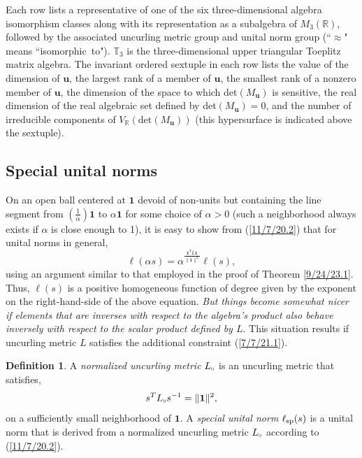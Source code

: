 \documentclass{amsart}
\numberwithin{equation}{section}
\theoremstyle{definition}
\newtheorem{definition}[theorem]{Definition}
\numberwithin{theorem}{section}
\begin{document}
\bigskip \bigskip


 {\small Each row lists a representative  of one of the six three-dimensional algebra isomorphism classes along with its representation as a subalgebra of $M_3(\mathbb{R})$, followed by the associated uncurling metric group and unital norm group (``$\approx$" means \mbox{``isomorphic to"}).  $\mathbb{T}_3$ is the three-dimensional upper triangular Toeplitz matrix algebra. The invariant ordered sextuple in each row lists the value of the dimension of $\mathbf{u}$, the largest rank of a member of $\mathbf{u}$, the smallest rank of a nonzero member of $\mathbf{u}$, the dimension of the space to which det$(M_{\mathbf{u}})$ is sensitive, the real dimension of the real algebraic set defined by det$(M_{\mathbf{u}}) =0$, and the number of irreducible components of $V_\mathbb{R}(\text{det}(M_{\mathbf{u}}))$ (this hypersurface is indicated above the sextuple).}
 

\vspace{.75cm}

\subsection{Special unital norms} \enlargethispage{1cm}
On an open ball centered at $\mathbf{1}$ devoid of non-units but containing the line segment from $\left(\frac{1}{\alpha}\right)\mathbf{1}$ to $\alpha\mathbf{1}$ for some choice of $\alpha>0$ (such a neighborhood always exists if $\alpha$ is close enough to 1), it is easy to show from (\ref{11/7/20.2}) that for unital norms in general,  \[  \ell(\alpha s) = \alpha^{\frac{\mathbf{1}^T L \mathbf{1}}{\|\mathbf{1}\|^2}} \ell(s),\] using an argument similar to that employed in the proof of Theorem \ref{9/24/23.1}. Thus, $ \ell(s)$ is a positive homogeneous function of degree given by the exponent on the right-hand-side of the above equation.  
   {\it But things become somewhat nicer if elements that are inverses with respect to the algebra's product also behave inversely with respect to the scalar product defined by $L$}.  
    This situation results if uncurling metric $L$ satisfies the additional constraint (\ref{7/7/21.1}).

    \begin{definition}\label{9/20/23.1} A {\it normalized uncurling metric} $L_{\shortparallel}$ is an uncurling metric that satisfies, \begin{equation} \label{7/7/21.1} s^TL_{\shortparallel} s^{-1} =\|{\bf 1}\|^2,\end{equation} on a sufficiently small neighborhood of $\mathbf{1}$.   A {\it special unital norm} $\ell_{\rm sp}(s)$ is a unital norm that is derived from a normalized uncurling metric $L_{\shortparallel}$ according to (\ref{11/7/20.2}). 
\end{definition}
\end{document}
